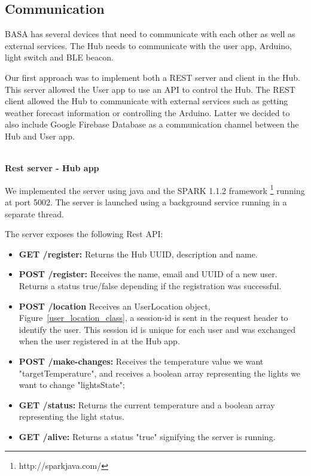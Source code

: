 \subsection{Communication}

BASA has several devices that need to communicate with each other as well as external services.
The Hub needs to communicate with the user app, Arduino, light switch and \ac{BLE} beacon. 

Our first approach was to implement both a \ac{REST} server and client in the Hub. This server allowed the User app to use an \ac{API} to control the Hub. The \ac{REST} client allowed the Hub to communicate with external services such as getting weather forecast information or controlling the Arduino.
Latter we decided to also include Google Firebase Database as a communication channel between the Hub and User app.


\mbox{}\\
\textbf{Rest server - Hub app}

We implemented the server using java and the SPARK 1.1.2 framework \footnote{http://sparkjava.com/} running at port 5002. The server is launched using a background service running in a separate thread.

The server exposes the following Rest API: 

\begin{itemize}
  \item \textbf{GET /register:} Returns the Hub UUID, description and name.
  \item \textbf{POST /register:} Receives the name, email and UUID of a new user. Returns a status true/false depending if the registration was successful.
  \item \textbf{POST /location} Receives an UserLocation object, Figure~\ref{user_location_class}, a session-id is sent in the request header to identify the user. This session id is unique for each user and was exchanged when the user registered in at the Hub app.
  \item \textbf{POST /make-changes:} Receives the temperature value we want "targetTemperature", and receives a boolean array representing the lights we want to change "lightsState";
   \item \textbf{GET /status:} Returns the current temperature and a boolean array representing the light status.
   \item \textbf{GET /alive:} Returns a status "true" signifying the server is running.
\end{itemize}

